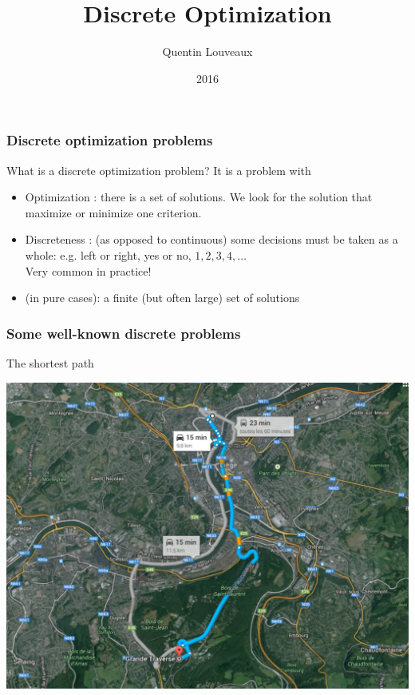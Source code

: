 \documentclass[9pt,handout]{beamer}
\title{Discrete Optimization}
\author{Quentin
Louveaux}
\institute{ULg - Institut Montefiore}
\date{2016}
\begin{document}
\begin{frame}
  \titlepage
\end{frame}
\begin{frame}
\frametitle{Discrete optimization problems}
\begin{block}{What is a discrete optimization problem?}
It is a problem with
\begin{itemize}
\item \alert{Optimization} : there is a set of solutions. We look for the solution that
\alert{maximize} or \alert{minimize} one criterion.\bigskip
\item \alert{Discreteness} : (as opposed to continuous) some decisions must be taken as a whole: e.g. left or right, yes or no, $1,2,3,4,\ldots$\\
Very common in practice!\bigskip
\item (in pure cases): a \alert{finite} (but often large) set of solutions
\end{itemize}
\end{block}
\end{frame}
\begin{frame}
\frametitle{Some well-known discrete problems }
\begin{center}
The shortest path
\end{center}
\begin{center}
\includegraphics[width=.7\linewidth]{ShortestPath.pdf}
\end{center}
\end{frame}
\end{document}
